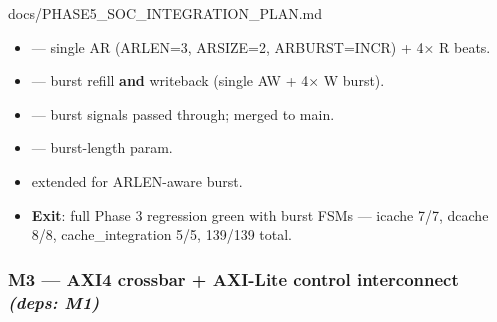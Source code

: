 \begin{relocated}{docs/PHASE5_SOC_INTEGRATION_PLAN.md}
\begin{itemize}
\tightlist
\item
  \ok{}  --- single AR (ARLEN=3, ARSIZE=2,
  ARBURST=INCR) + 4× R beats.
\item
  \ok{}  --- burst refill \textbf{and}
  writeback (single AW + 4× W burst).
\item
  \ok{}  --- burst signals passed
  through; merged to main.
\item
  \ok{}  --- 
  burst-length param.
\item
  \ok{}  extended for ARLEN-aware
  burst.
\item
  \textbf{Exit}: full Phase 3 regression green with burst FSMs ---
  icache 7/7, dcache 8/8, cache\_\allowbreak{}integration 5/5, 139/139
  total.
\end{itemize}

\subsubsection{\texorpdfstring{M3 --- AXI4 crossbar + AXI-Lite control
interconnect \emph{(deps:
M1)}}{M3 --- AXI4 crossbar + AXI-Lite control interconnect (deps: M1)}}\label{ds:ch:phase5-soc-integration-plan:m3-axi4-crossbar-axi-lite-control-interconnect-deps-m1}


\end{relocated}
